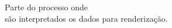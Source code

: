 \documentclass[preview]{standalone}
\begin{document}
\begin{center}
Parte do processo onde\\são interpretados os dados para renderização.
\end{center}
\end{document}
